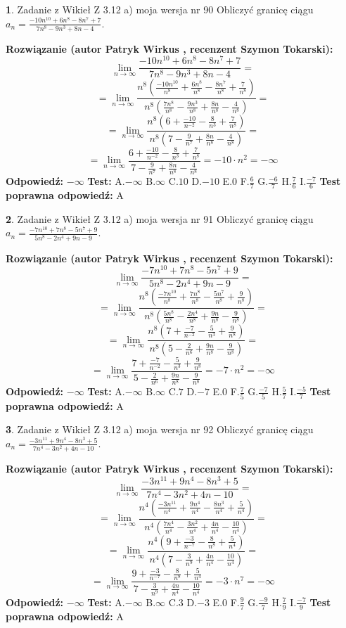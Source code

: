 \documentclass[12pt, a4paper]{article}
\theoremstyle{definition} %
\newtheorem{zad}{}
\newcommand{\zadStart}[1]{\begin{zad}#1\newline}
\newcommand{\zadStop}{\end{zad}}
\newcommand{\rozwStart}[2]{\noindent \textbf{Rozwiązanie (autor #1 , recenzent #2): }\newline}
\newcommand{\rozwStop}{\newline}
\newcommand{\odpStart}{\noindent \textbf{Odpowiedź:}\newline}
\newcommand{\odpStop}{\newline}
\newcommand{\testStart}{\noindent \textbf{Test:}\newline}
\newcommand{\testStop}{\newline}
\newcommand{\kluczStart}{\noindent \textbf{Test poprawna odpowiedź:}\newline}
\newcommand{\kluczStop}{\newline}
\begin{document}
\zadStart{Zadanie z Wikieł Z 3.12 a) moja wersja nr 90}
Obliczyć granicę ciągu $a_{n}=\frac{-10n^{10}+6n^{8}-8n^{7}+7}{7n^{8}-9n^{3}+8n-4}$.
\zadStop
\rozwStart{Patryk Wirkus}{Szymon Tokarski}
$$\lim\limits_{n\to\infty}\frac{-10n^{10}+6n^{8}-8n^{7}+7}{7n^{8}-9n^{3}+8n-4}=$$
$$=\lim\limits_{n\to\infty}\frac{n^{8}\left(\frac{-10n^{10}}{n^{8}}+\frac{6n^{8}}{n^{8}}-\frac{8n^{7}}{n^{8}}+\frac{7}{n^{8}}\right)}{n^{8}\left(\frac{7n^{8}}{n^{8}}-\frac{9n^{3}}{n^{8}}+\frac{8n}{n^{8}}-\frac{4}{n^{8}}\right)}=$$
$$=\lim\limits_{n\to\infty}\frac{n^{8}\left(6+\frac{-10}{n^{-2}}-\frac{8}{n^{3}}+\frac{7}{n^{8}}\right)}
{n^{8}\left(7-\frac{9}{n^{7}}+\frac{8n}{n^{8}}-\frac{4}{n^{8}}\right)}=$$
$$=\lim\limits_{n\to\infty}\frac{6+\frac{-10}{n^{-2}}-\frac{8}{n^{3}}+\frac{7}{n^{8}}}{7-\frac{9}{n^{7}}+\frac{8n}{n^{8}}-\frac{4}{n^{8}}}=-10\cdot n^{2} = -\infty$$
\rozwStop
\odpStart
$-\infty$
\odpStop
\testStart
A.$-\infty$
B.$\infty$
C.$10$
D.$-10$
E.$0$
F.$\frac{6}{7}$
G.$\frac{-6}{7}$
H.$\frac{7}{6}$
I.$\frac{-7}{6}$
\testStop
\kluczStart
A
\kluczStop



\zadStart{Zadanie z Wikieł Z 3.12 a) moja wersja nr 91}
Obliczyć granicę ciągu $a_{n}=\frac{-7n^{10}+7n^{8}-5n^{7}+9}{5n^{8}-2n^{4}+9n-9}$.
\zadStop
\rozwStart{Patryk Wirkus}{Szymon Tokarski}
$$\lim\limits_{n\to\infty}\frac{-7n^{10}+7n^{8}-5n^{7}+9}{5n^{8}-2n^{4}+9n-9}=$$
$$=\lim\limits_{n\to\infty}\frac{n^{8}\left(\frac{-7n^{10}}{n^{8}}+\frac{7n^{8}}{n^{8}}-\frac{5n^{7}}{n^{8}}+\frac{9}{n^{8}}\right)}{n^{8}\left(\frac{5n^{8}}{n^{8}}-\frac{2n^{4}}{n^{8}}+\frac{9n}{n^{8}}-\frac{9}{n^{8}}\right)}=$$
$$=\lim\limits_{n\to\infty}\frac{n^{8}\left(7+\frac{-7}{n^{-2}}-\frac{5}{n^{3}}+\frac{9}{n^{8}}\right)}
{n^{8}\left(5-\frac{2}{n^{6}}+\frac{9n}{n^{8}}-\frac{9}{n^{8}}\right)}=$$
$$=\lim\limits_{n\to\infty}\frac{7+\frac{-7}{n^{-2}}-\frac{5}{n^{3}}+\frac{9}{n^{8}}}{5-\frac{2}{n^{6}}+\frac{9n}{n^{8}}-\frac{9}{n^{8}}}=-7\cdot n^{2} = -\infty$$
\rozwStop
\odpStart
$-\infty$
\odpStop
\testStart
A.$-\infty$
B.$\infty$
C.$7$
D.$-7$
E.$0$
F.$\frac{7}{5}$
G.$\frac{-7}{5}$
H.$\frac{5}{7}$
I.$\frac{-5}{7}$
\testStop
\kluczStart
A
\kluczStop



\zadStart{Zadanie z Wikieł Z 3.12 a) moja wersja nr 92}
Obliczyć granicę ciągu $a_{n}=\frac{-3n^{11}+9n^{4}-8n^{3}+5}{7n^{4}-3n^{2}+4n-10}$.
\zadStop
\rozwStart{Patryk Wirkus}{Szymon Tokarski}
$$\lim\limits_{n\to\infty}\frac{-3n^{11}+9n^{4}-8n^{3}+5}{7n^{4}-3n^{2}+4n-10}=$$
$$=\lim\limits_{n\to\infty}\frac{n^{4}\left(\frac{-3n^{11}}{n^{4}}+\frac{9n^{4}}{n^{4}}-\frac{8n^{3}}{n^{4}}+\frac{5}{n^{4}}\right)}{n^{4}\left(\frac{7n^{4}}{n^{4}}-\frac{3n^{2}}{n^{4}}+\frac{4n}{n^{4}}-\frac{10}{n^{4}}\right)}=$$
$$=\lim\limits_{n\to\infty}\frac{n^{4}\left(9+\frac{-3}{n^{-7}}-\frac{8}{n^{8}}+\frac{5}{n^{4}}\right)}
{n^{4}\left(7-\frac{3}{n^{9}}+\frac{4n}{n^{4}}-\frac{10}{n^{4}}\right)}=$$
$$=\lim\limits_{n\to\infty}\frac{9+\frac{-3}{n^{-7}}-\frac{8}{n^{8}}+\frac{5}{n^{4}}}{7-\frac{3}{n^{9}}+\frac{4n}{n^{4}}-\frac{10}{n^{4}}}=-3\cdot n^{7} = -\infty$$
\rozwStop
\odpStart
$-\infty$
\odpStop
\testStart
A.$-\infty$
B.$\infty$
C.$3$
D.$-3$
E.$0$
F.$\frac{9}{7}$
G.$\frac{-9}{7}$
H.$\frac{7}{9}$
I.$\frac{-7}{9}$
\testStop
\kluczStart
A
\kluczStop
\end{document}
